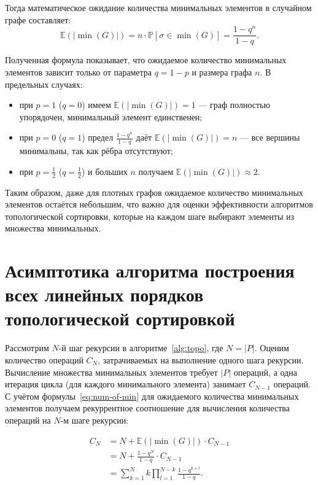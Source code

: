 Тогда математическое ожидание количества минимальных элементов в
случайном графе составляет:
\begin{equation}
  \label{eq:num-of-min}
  \mathbb{E}(|\min(G)|) = n \cdot \mathbb{P}[\sigma \in \min(G)] =
  \frac{1-q^n}{1-q}.
\end{equation}

Полученная формула показывает, что ожидаемое количество минимальных
элементов зависит только от параметра $q = 1-p$ и размера графа $n$.
В предельных случаях:
\begin{itemize}
  \item при $p = 1$ ($q = 0$) имеем $\mathbb{E}(|\min(G)|) = 1$ —
    граф полностью упорядочен, минимальный элемент единственен;
  \item при $p = 0$ ($q = 1$) предел $\frac{1-q^n}{1-q}$ даёт
    $\mathbb{E}(|\min(G)|) = n$ — все вершины минимальны, так как
    рёбра отсутствуют;
  \item при $p = \frac{1}{2}$ ($q = \frac{1}{2}$) и больших $n$
    получаем $\mathbb{E}(|\min(G)|) \approx 2$.
\end{itemize}

Таким образом, даже для плотных графов ожидаемое количество
минимальных элементов остаётся небольшим, что важно для оценки
эффективности алгоритмов топологической сортировки, которые на каждом
шаге выбирают элементы из множества минимальных.

\section{Асимптотика алгоритма построения всех линейных порядков
топологической сортировкой}
\label{sec:ch2/topoalg-comp}

Рассмотрим $N$-й шаг рекурсии в алгоритме~\ref{alg:topo}, где $N =
|P|$. Оценим количество операций $C_N$, затрачиваемых на выполнение
одного шага рекурсии. Вычисление множества минимальных элементов
требует $|P|$ операций, а одна итерация цикла (для каждого
минимального элемента) занимает $C_{N-1}$ операций. С учётом
формулы~\eqref{eq:num-of-min} для ожидаемого количества минимальных
элементов получаем рекуррентное соотношение для вычисления количества
операций на $N$-м шаге рекурсии:

\begin{equation}
  \label{eq:topo-comp}
  \begin{aligned}
    C_N &= N + \mathbb{E}(|\min(G)|) \cdot C_{N-1} \\
    &= N + \frac{1-q^N}{1-q} \cdot C_{N-1} \\
    &= \sum_{k=1}^{N} k \prod_{l=1}^{N-k} \frac{1-q^{k+l}}{1-q}.
  \end{aligned}
\end{equation}

